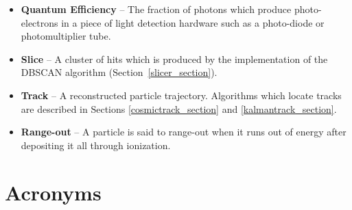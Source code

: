 \begin{itemize}
\item \textbf{Quantum Efficiency} -- The fraction of photons which produce photo-electrons in a piece of light detection hardware such as a photo-diode or photomultiplier tube.

\item \textbf{Slice} -- A cluster of hits which is produced by the \nova
implementation \cite{baird2015thesis} of the DBSCAN \cite{ester1996density}
algorithm (Section~\ref{slicer_section}).

\item \textbf{Track} -- A reconstructed particle trajectory.  Algorithms
which locate tracks are described in Sections \ref{cosmictrack_section} and
\ref{kalmantrack_section}.

\item \textbf{Range-out} -- A particle is said to range-out when it runs out of
energy after depositing it all through ionization.

\end{itemize}

\section{Acronyms}
\label{acronymsec}


